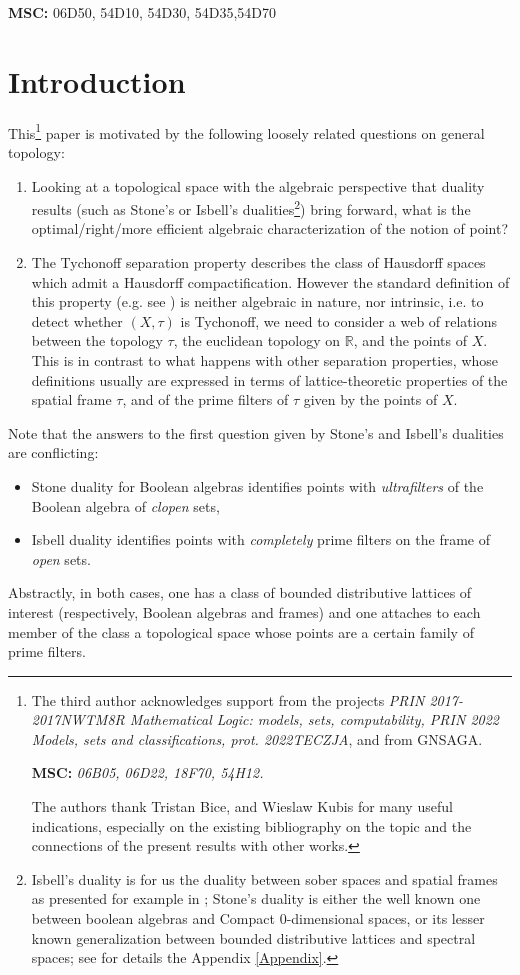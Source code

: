 \documentclass{article}
\theoremstyle{plain}
\theoremstyle{definition}
\theoremstyle{remark}
\newcommand{\0}{\mathbbm 0}
\newcommand{\1}{\mathbbm 1}
\newcommand{\2}{\mathbbm 2}
\begin{document}
\textbf{MSC:} 06D50, 54D10, 54D30, 54D35,54D70

\section{Introduction}
This\footnote{The third author acknowledges support from the projects
\emph{PRIN 2017-2017NWTM8R
Mathematical Logic: models, sets, computability, PRIN 2022 Models, sets and classifications, prot. 2022TECZJA}, and from GNSAGA.

\textbf{MSC:} \emph{06B05, 06D22, 18F70, 54H12.}  

The authors thank Tristan Bice, and Wieslaw Kubis for many useful indications, especially on the existing bibliography on the topic and the connections of the present results with other works. 
} paper is motivated by the following loosely related questions on general topology:
\begin{enumerate}
\item
Looking at a topological space with the algebraic perspective that duality results (such as Stone's or Isbell's dualities\footnote{Isbell's duality is for us the duality between sober spaces and spatial frames as presented for example in \cite[Cor. IX.3.4]{MacLMoer}; Stone's duality is either the well known one between boolean algebras and Compact $0$-dimensional spaces, or its lesser known generalization between bounded distributive lattices and spectral spaces; see for details the Appendix \ref{Appendix}.}) bring forward,
what is the optimal/right/more efficient algebraic characterization of the notion of point?
\item
The Tychonoff separation property describes the class of Hausdorff spaces which admit a Hausdorff compactification. However the standard definition of this property (e.g. see \cite[Def. D.3.3]{VIABOOKFORCING}) is neither algebraic in nature, nor intrinsic, i.e. to detect whether $(X,\tau)$ is Tychonoff, we need to consider a web of relations between the topology $\tau$, the euclidean topology on $\mathbb{R}$, and the points of $X$. This is in contrast to what happens with other separation properties, whose definitions usually are expressed in terms of lattice-theoretic properties of the spatial frame $\tau$, and of the prime filters of $\tau$ given by the points of $X$.
\end{enumerate}

Note that the answers to the first question given by Stone's and Isbell's dualities are  conflicting:
\begin{itemize}
\item
Stone duality for Boolean algebras identifies points with \emph{ultrafilters} of the Boolean algebra of \emph{clopen} sets,
\item
Isbell duality identifies points with \emph{completely} prime filters on the frame of \emph{open} sets.
\end{itemize}
Abstractly, in both cases, one has a class of bounded distributive lattices of interest (respectively, Boolean algebras and frames) and one attaches to each member of the class a topological space whose points are a certain family of prime filters.
\end{document}
